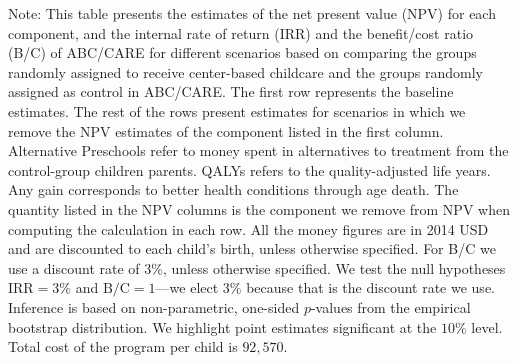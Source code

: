 \documentclass[static]{JJH-Beamer}
\begin{document}
\vspace{-8mm}
{\flushleft \small Note: This table presents the estimates of the net present value (NPV) for each component, and the internal rate of return (IRR) and the benefit/cost ratio (B/C) of ABC/CARE for different scenarios based on comparing the groups randomly assigned to receive center-based childcare and the groups randomly assigned as control in ABC/CARE. The first row represents the baseline estimates. The rest of the rows present estimates for scenarios in which we remove the NPV estimates of the component listed in the first column. Alternative Preschools refer to money spent in alternatives to treatment from the control-group children parents. QALYs refers to the quality-adjusted life years. Any gain corresponds to better health conditions through age death. The quantity listed in the NPV columns is the component we remove from NPV when computing the calculation in each row. All the money figures are in 2014 USD and are discounted to each child's birth, unless otherwise specified. For B/C we use a discount rate of $3\%$, unless otherwise specified. We test the null hypotheses $\text{IRR} = 3\%$ and $\text{B/C} = 1$---we elect $3\%$ because that is the discount rate we use. Inference is based on non-parametric, one-sided $p$-values from the empirical bootstrap distribution. We highlight point estimates significant at the $10\%$ level.\\
Total cost of the program per child is $92,570$.\\}

\clearpage
\end{document}
